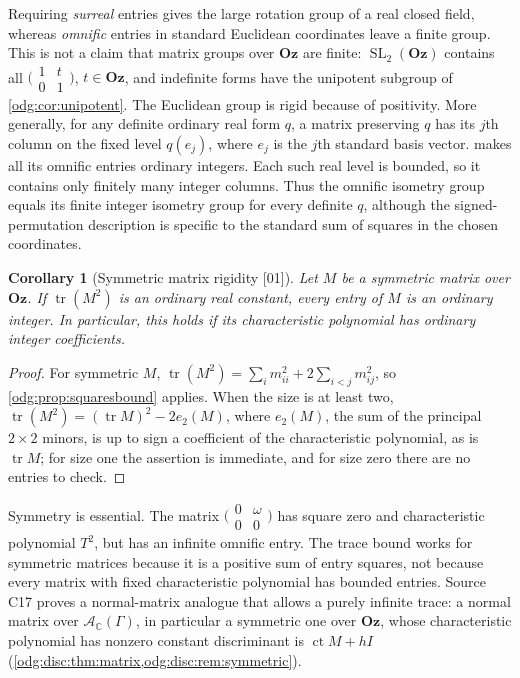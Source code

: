 \documentclass[11pt,oneside]{article}
\numberwithin{equation}{section}
\newtheorem{corollary}[corollary]{Corollary}
\theoremstyle{definition}
\theoremstyle{remark}
\newcommand{\Oz}{\mathbf{Oz}}
\newcommand{\C}{\mathbb C}
\newcommand{\ct}{\operatorname{ct}}
\newcommand{\SL}{\operatorname{SL}}
\newcommand{\tr}{\operatorname{tr}}
\newcommand{\src}[1]{\textup{\textsf{\small[#1]}}}
\begin{document}
Requiring \emph{surreal} entries gives the large rotation group of a real
closed field, whereas \emph{omnific} entries in standard Euclidean
coordinates leave a finite group. This is not a claim that matrix groups over
$\Oz$ are finite: $\SL_2(\Oz)$ contains all $\bigl(\begin{smallmatrix}1&t\\0&1\end{smallmatrix}\bigr)$,
$t\in\Oz$, and indefinite forms have the unipotent subgroup of
\cref{odg:cor:unipotent}. The Euclidean group is rigid because of
positivity. More generally, for any definite ordinary real form $q$, a
matrix preserving $q$ has its $j$th column on the fixed level $q(e_j)$,
where $e_j$ is the $j$th standard basis vector.
 makes all its omnific entries ordinary integers.
Each such real level is bounded, so it contains only finitely many integer
columns. Thus the omnific isometry group equals its finite integer isometry
group for every definite $q$, although the signed-permutation description
is specific to the standard sum of squares in the chosen coordinates.

\begin{corollary}[Symmetric matrix rigidity \src{01}]\label{odg:cor:symmetric}
Let $M$ be a symmetric matrix over $\Oz$. If $\tr(M^2)$ is an ordinary real
constant, every entry of $M$ is an ordinary integer. In particular, this
holds if its characteristic polynomial has ordinary integer coefficients.
\end{corollary}
\begin{proof}
For symmetric $M$, $\tr(M^2)=\sum_i m_{ii}^2+2\sum_{i<j}m_{ij}^2$, so
\cref{odg:prop:squaresbound} applies. When the size is at least two,
$\tr(M^2)=(\tr M)^2-2e_2(M)$, where $e_2(M)$, the sum of the principal
$2\times2$ minors, is up to sign a coefficient of the characteristic
polynomial, as is $\tr M$; for size one the assertion is immediate, and
for size zero there are no entries to check.
\end{proof}

Symmetry is essential. The matrix
$\bigl(\begin{smallmatrix}0&\omega\\0&0\end{smallmatrix}\bigr)$ has square
zero and characteristic polynomial $T^2$, but has an infinite omnific entry.
The trace bound works for symmetric matrices because it is a positive sum
of entry squares, not because every matrix with fixed characteristic
polynomial has bounded entries.
Source C17 proves a normal-matrix analogue that allows a purely infinite trace: a normal
matrix over $\mathcal A_\C(\Gamma)$, in particular a symmetric one over $\Oz$, whose
characteristic polynomial has nonzero constant discriminant is $\ct M+hI$
(\cref{odg:disc:thm:matrix,odg:disc:rem:symmetric}).
\end{document}
